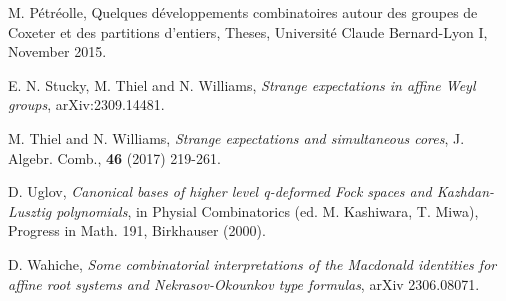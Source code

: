 \documentclass[11pt]{amsart}
\theoremstyle{plain}
\numberwithin{equation}{subsection}
\begin{document}
\begin{thebibliography}{}
 M. Pétréolle, Quelques développements combinatoires autour des groupes de Coxeter et des partitions d’entiers, Theses, Université
Claude Bernard-Lyon I, November 2015.

 E. N. Stucky, M. Thiel and N. Williams, {\em Strange expectations in affine Weyl
groups}, arXiv:2309.14481.

 M. Thiel and N. Williams, {\em Strange expectations and simultaneous cores}, J. Algebr. Comb., {\bf 46} (2017) 219-261.

 D. Uglov, {\em Canonical bases of higher level q-deformed Fock spaces and Kazhdan-Lusztig polynomials}, in Physial
Combinatorics (ed. M. Kashiwara, T. Miwa), Progress in Math. 191, Birkhauser (2000).

 D. Wahiche, {\em Some combinatorial interpretations of the Macdonald identities for affine root systems and Nekrasov-Okounkov type
formulas}, arXiv 2306.08071.

\end{thebibliography}
\end{document}
